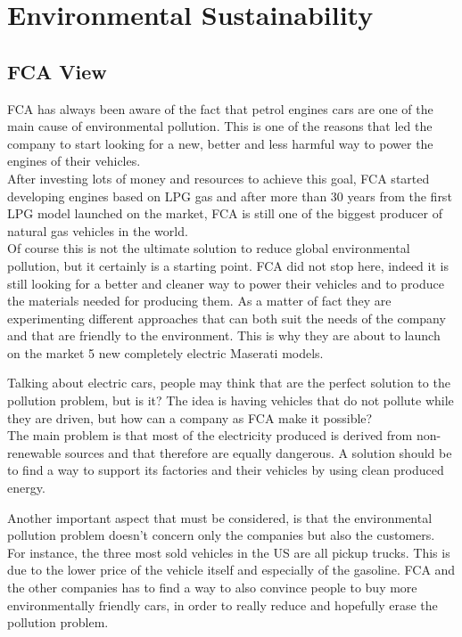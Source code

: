 \section{Environmental Sustainability}
\subsection{FCA View}
FCA has always been aware of the fact that petrol engines cars are one of the main cause of environmental pollution. This is one of the reasons that led the company to start looking for a new, better and less harmful way to power the engines of their vehicles.\\
After investing lots of money and resources to achieve this goal, FCA started developing engines based on LPG gas and after more than 30 years from the first LPG model launched on the market, FCA is still one of the biggest producer of natural gas vehicles in the world\cite{FCA_sustainability}.\\
Of course this is not the ultimate solution to reduce global environmental pollution, but it certainly is a starting point. FCA did not stop here, indeed it is still looking for a better and cleaner way to power their vehicles and to produce the materials needed for producing them. As a matter of fact they are experimenting different approaches that can both suit the needs of the company and that are friendly to the environment. This is why they are about to launch on the market 5 new completely electric Maserati models\cite{Maserati_electric}.

Talking about electric cars, people may think that are the perfect solution to the pollution problem, but is it?
The idea is having vehicles that do not pollute while they are driven, but how can a company as FCA make it possible?\\
The main problem is that most of the electricity produced is derived from non-renewable sources and that therefore are equally dangerous. A solution should be to find a way to support its factories and their vehicles by using clean produced energy.

Another important aspect that must be considered, is that the environmental pollution problem doesn't concern only the companies but also the customers. For instance, the three most sold vehicles in the US are all pickup trucks\cite{US_best-selling-vehicle}. This is due to the lower price of the vehicle itself and especially of the gasoline. 
FCA and the other companies has to find a way to also convince people to buy more environmentally friendly cars, in order to really reduce and hopefully erase the pollution problem.

